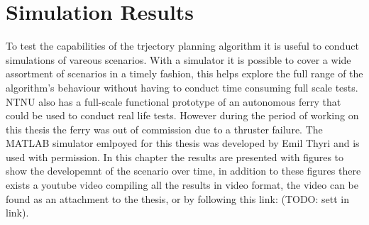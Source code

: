 \section{Simulation Results}

To test the capabilities of the trjectory planning algorithm it is useful to conduct simulations of vareous scenarios.
With a simulator it is possible to cover a wide assortment of scenarios in a timely fashion, this helps explore the full
range of the algorithm's behaviour without having to conduct time consuming full scale tests. NTNU also has a full-scale
functional prototype of an autonomous ferry that could be used to conduct real life tests. However during the period of working
on this thesis the ferry was out of commission due to a thruster failure.
The MATLAB simulator emlpoyed for this thesis was developed by Emil Thyri and is used with permission. In this chapter the results
are presented with figures to show the developemnt of the scenario over time, in addition to these figures there exists a youtube video compiling
all the results in video format, the video can be found as an attachment to the thesis, or by following this link: (TODO: sett in link).

